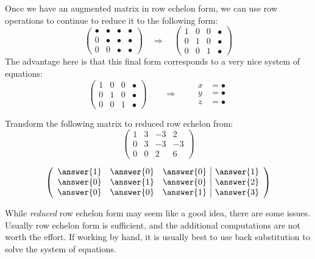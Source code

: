 \documentclass{ximera}
\begin{document}
Once we have an augmented matrix in row echelon form, we can use row
operations to continue to reduce it to the following form:
\[
\left(\begin{array}{ccc|c}
  \bullet & \bullet & \bullet & \bullet \\
     0   & \bullet & \bullet & \bullet \\
     0  &    0 & \bullet & \bullet
\end{array}\right)
\quad
\Rightarrow
\quad
\left(\begin{array}{ccc|c}
  1 & 0 & 0  & \bullet \\
     0   & 1  &  0 & \bullet \\
     0  &    0 & 1 & \bullet
\end{array}\right)
\]
The advantage here is that this final form corresponds to a very nice system of equations:
\[
\left(\begin{array}{ccc|c}
  1 &   0 & 0 & \bullet  \\
  0 &   1 & 0 & \bullet \\
   0& 0  &  1 & \bullet
\end{array}\right)
\qquad\Longrightarrow\qquad
\begin{aligned}
      x &= \bullet  \\
      y &= \bullet  \\
      z &=\bullet
\end{aligned}
\]
\begin{question}
  Transform the following matrix to reduced row echelon from:
  \[
  \left(\begin{array}{ccc|c}
  1 & 3 & -3 & 2  \\
  0 & 3 & -3 & -3 \\
  0 & 0 &  2 & 6
  \end{array}\right)
  \]
  \begin{prompt}
    \[
    \left(\begin{array}{ccc|c}
      \answer{1} & \answer{0} & \answer{0} & \answer{1} \\
      \answer{0} & \answer{1} & \answer{0} & \answer{2} \\
      \answer{0} & \answer{0} & \answer{1} & \answer{3}
    \end{array}\right)
    \]
  \end{prompt}
\end{question}
While \textit{reduced} row echelon form may seem like a good idea,
there are some issues.  Usually row echelon form is sufficient, and
the additional computations are not worth the effort.  If working by
hand, it is usually best to use back substitution to solve the system of equations.
\end{document}

